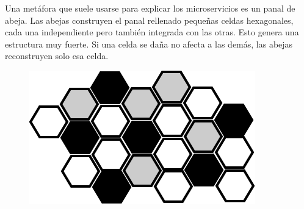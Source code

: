 \documentclass[12pt]{report} %
\begin{document}
	Una metáfora que suele usarse para explicar los microservicios es un panal de abeja. Las abejas construyen el panal rellenado pequeñas celdas hexagonales, cada una independiente pero también integrada con las otras. Esto genera una estructura muy fuerte. Si una celda se daña no afecta a las demás, las abejas reconstruyen solo esa celda.
	\begin{figure}
		\centering
		\includegraphics[width=0.7\linewidth]{imagenes/panalAbeja}
		\caption{}
		\label{fig:panalabeja}
	\end{figure}
	
	
	
	




\clearpage
{}
\printbibliography




\end{document}
